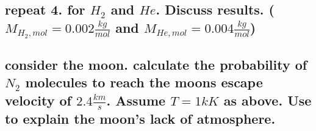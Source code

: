 \documentclass[a4paper,11pt]{article}
\begin{document}
\subsection{ repeat 4. for $H_2$ and $He$. Discuss results. ($M_{H_2, mol} = 0.002\frac{kg}{mol}$ and 
            $M_{He, mol} = 0.004\frac{kg}{mol}$)  }%


\subsection{ consider the moon. calculate the probability of $N_2$ molecules to reach the moons escape velocity of
            $2.4\frac{km}{s}$. Assume $T=1kK$ as above. Use to explain the moon's lack of atmosphere. }%




\end{document}
